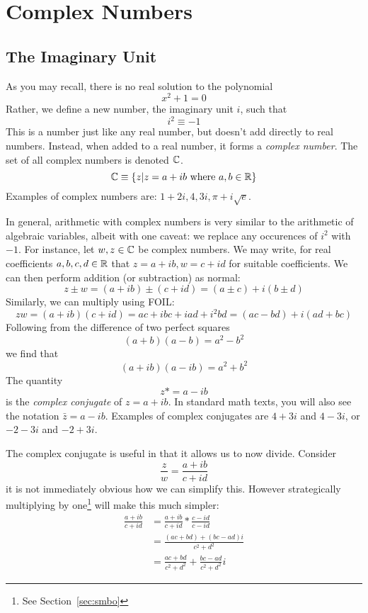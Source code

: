 \chapter{Complex Numbers}\label{ch:complex}
\section{The Imaginary Unit}
As you may recall, there is no real solution to the polynomial 
\[x^2+1=0\]
Rather, we define a new number, the imaginary unit \(i\), such that
\[i^2\equiv-1\]
This is a number just like any real number, but doesn't add directly to real numbers. Instead, when added to a real number, it forms a \emph{complex number}. The set of all complex numbers is denoted \(\mathbb{C}\).
\begin{equation}
	\mathbb{C}\equiv\{z | z = a+ib \text{\ where } a,b\in \mathbb{R}\}
\end{equation}
Examples of complex numbers are: \(1+2i, 4, 3i, \pi+i\sqrt{e}\).

In general, arithmetic with complex numbers is very similar to the arithmetic of algebraic variables, albeit with one caveat: we replace any occurences of \(i^2\) with \(-1\). For instance, let \(w,z\in\mathbb{C}\) be complex numbers. We may write, for real coefficients \(a,b,c,d\in\mathbb{R}\) that \(z=a+ib, w= c+id\) for suitable coefficients. We can then perform addition (or subtraction) as normal:
\begin{equation}
	z\pm w = (a+ib) \pm (c+id) = (a\pm c) + i(b\pm d)
\end{equation}
Similarly, we can multiply using FOIL:\@
\begin{equation}
	zw = (a+ib)(c+id) = ac + ibc + iad + i^2bd = (ac-bd) +i(ad+bc)
\end{equation}
Following from the difference of two perfect squares
\[(a+b)(a-b)=a^2-b^2\]
we find that 
\[(a+ib)(a-ib)=a^2+b^2\]
The quantity
\begin{equation}
	z\ast = a-ib
\end{equation}
is the \emph{complex conjugate} of \(z=a+ib\). In standard math texts, you will also see the notation \(\bar z = a-ib\). Examples of complex conjugates are \(4+3i\) and \(4-3i\), or \(-2-3i\) and \(-2+3i\). 

The complex conjugate is useful in that it allows us to now divide. Consider
\[\frac{z}{w} = \frac{a+ib}{c+id}\]
it is not immediately obvious how we can simplify this. However strategically multiplying by one\footnote{See Section~\ref{sec:smbo}} will make this much simpler:
\begin{align}
	\frac{a+ib}{c+id} &=\frac{a+ib}{c+id}*\frac{c-id}{c-id}\nonumber\\
			  &=\frac{(ac+bd)+(bc-ad)i}{c^2+d^2}\nonumber\\
			  &=\frac{ac+bd}{c^2+d^2} + \frac{bc-ad}{c^2+d^2}i
\end{align}

